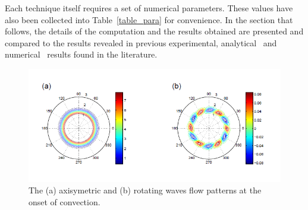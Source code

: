 Each technique itself requires a set of numerical parameters. These values have also been collected into Table~\ref{table_para} for convenience. In the section that follows, the details of the computation and the results obtained are presented and compared to the results revealed in previous experimental, analytical~\cite{linearstability} and numerical~\cite{SBSAE,PeiChunTsain} results found in the literature.
\begin{figure}[t]
\centerline{\includegraphics[width= .9\textwidth]{./figures/Pictures/axi_rot_plot.png}}
\caption{The (a) axisymetric and (b) rotating waves flow patterns at the onset of convection.}
\label{axi2rot}
\end{figure}

